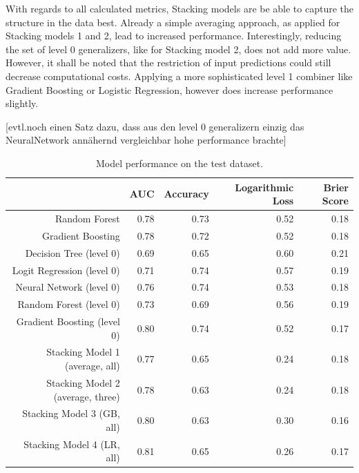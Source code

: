 \documentclass[12pt]{article}
\begin{document}
With regards to all calculated metrics, Stacking models are be able to capture the structure in the data best. Already a simple averaging approach, as applied for Stacking models 1 and 2, lead to increased performance. Interestingly, reducing the set of level 0 generalizers, like for Stacking model 2, does not add more value. However, it shall be noted that the restriction of input predictions could still decrease computational costs. Applying a more sophisticated level 1 combiner like Gradient Boosting or Logistic Regression, however does increase performance slightly. 

[evtl.noch einen Satz dazu, dass aus den level 0 generalizern einzig das NeuralNetwork annähernd vergleichbar hohe performance brachte]


\begin{table}[ht]
\centering
\begin{tabular}{rrrrr}
  \hline
 & AUC & Accuracy & Logarithmic Loss & Brier Score \\ 
  \hline
Random Forest & 0.78 & 0.73 & 0.52 & 0.18 \\ 
  Gradient Boosting & 0.78 & 0.72 & 0.52 & 0.18 \\
\hline 
  Decision Tree (level 0) & 0.69 & 0.65 & 0.60 & 0.21 \\ 
  Logit Regression (level 0) & 0.71 & 0.74 & 0.57 & 0.19 \\ 
  Neural Network (level 0) & 0.76 & 0.74 & 0.53 & 0.18 \\ 
  Random Forest (level 0) & 0.73 & 0.69 & 0.56 & 0.19 \\ 
  Gradient Boosting (level 0) & 0.80 & 0.74 & 0.52 & 0.17 \\ 
\hline
  Stacking Model 1 (average, all) & 0.77 & 0.65 & 0.24 & 0.18 \\ 
  Stacking Model 2 (average, three) & 0.78 & 0.63 & 0.24 & 0.18 \\ 
  Stacking Model 3 (GB, all) & 0.80 & 0.63 & 0.30 & 0.16 \\ 
  Stacking Model 4 (LR, all) & 0.81 & 0.65 & 0.26 & 0.17 \\ 
   \hline
\end{tabular}
\caption{Model performance on the test dataset.}\label{eval}
\end{table}
\end{document}

